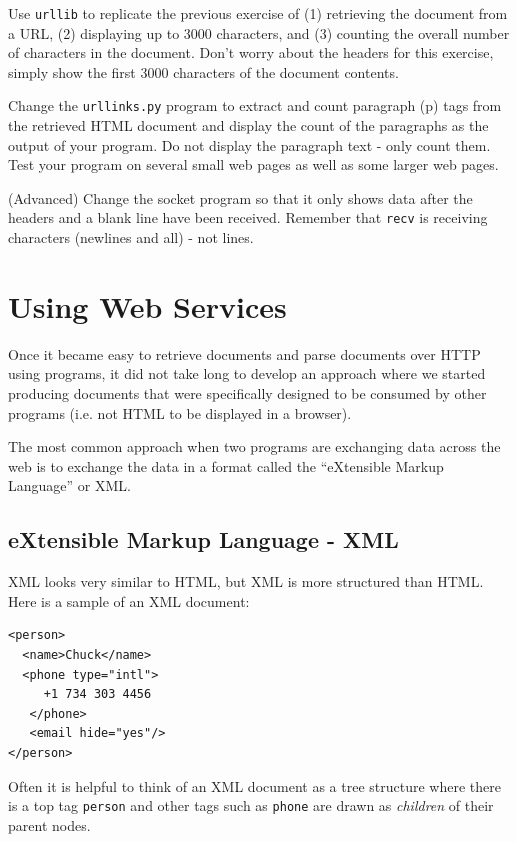 \documentclass[11pt]{book}
\begin{document}
\begin{ex}
Use {\tt urllib} to replicate the previous exercise of (1) retrieving the document
from a URL, (2) displaying up to 3000 characters, and (3) counting the overall number
of characters in the document.  Don't worry about the headers for this exercise, simply
show the first 3000 characters of the document contents.
\end{ex}

\begin{ex}
Change the {\tt urllinks.py} program to extract and count 
paragraph (p) tags from the retrieved HTML document and 
display the count of the paragraphs as the 
output of your program.  
Do not display the paragraph text - only count them.
Test your program on several small web pages
as well as some larger web pages.
\end{ex}

\begin{ex}
(Advanced) Change the socket program so that it only shows data after the 
headers and a blank line have been received.  Remember that {\tt recv} is
receiving characters (newlines and all) - not lines.
\end{ex}


\chapter{Using Web Services}

Once it became easy to retrieve documents and parse documents 
over HTTP using programs, it did not take long to develop 
an approach where we started producing documents that were specifically
designed to be consumed by other 
programs (i.e. not HTML to be displayed in a browser).

The most common approach when two programs are exchanging data across 
the web is to exchange the data in a format called the ``eXtensible Markup 
Language'' or XML.  

\section{eXtensible Markup Language - XML}

XML looks very similar to HTML, but XML is more structured 
than HTML.  Here is a sample of an XML document:

\beforeverb
\begin{verbatim}
<person>
  <name>Chuck</name>
  <phone type="intl">
     +1 734 303 4456
   </phone>
   <email hide="yes"/>
</person>
\end{verbatim}
\afterverb
%
Often it is helpful to think of an XML document as a tree structure
where there is a top tag {\tt person} and other tags such as {\tt phone}
are drawn as \emph{children} of their parent nodes.
\end{document}

